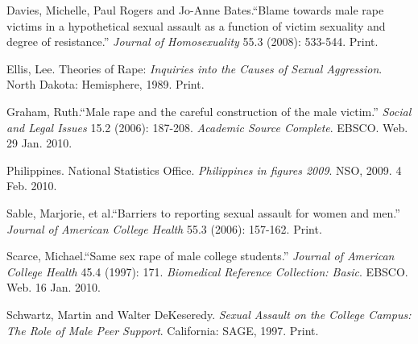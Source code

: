 \begin{workscited}
	
\bibent
Davies, Michelle, Paul Rogers and Jo-Anne Bates.``Blame towards male rape victims in a hypothetical sexual assault as a function of victim sexuality and degree of resistance.'' \textit{Journal of Homosexuality} 55.3 (2008): 533-544. Print.

\bibent
Ellis, Lee. Theories of Rape: \textit{Inquiries into the Causes of Sexual Aggression}. North Dakota: Hemisphere, 1989. Print.

\bibent
Graham, Ruth.``Male rape and the careful construction of the male victim.'' \textit{Social and Legal Issues} 15.2 (2006): 187-208. \textit{Academic Source Complete}. EBSCO. Web. 29 Jan. 2010.

\bibent
Philippines. National Statistics Office. \textit{Philippines in figures 2009}. NSO, 2009. 4 Feb. 2010.

\bibent
Sable, Marjorie, et al.``Barriers to reporting sexual assault for women and men.'' \textit{Journal of American College Health} 55.3 (2006): 157-162. Print.

\bibent
Scarce, Michael.``Same sex rape of male college students.'' \textit{Journal of American College Health} 45.4 (1997): 171. \textit{Biomedical Reference Collection: Basic}. EBSCO. Web. 16 Jan. 2010.

\bibent
Schwartz, Martin and Walter DeKeseredy. \textit{Sexual Assault on the College Campus: The Role of Male Peer Support}. California: SAGE, 1997. Print.

\end{workscited}
